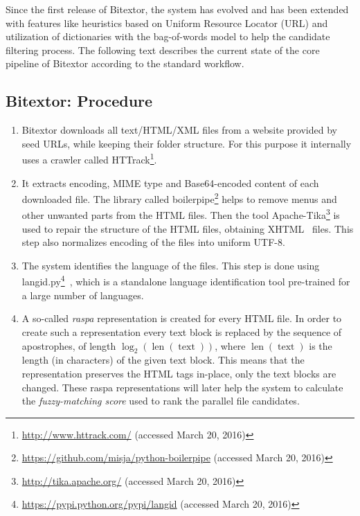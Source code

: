 Since the first release of Bitextor, the system has evolved and has been extended with features like heuristics based on Uniform Resource Locator (URL) and utilization of dictionaries with the bag-of-words model to help the candidate filtering process. The following text describes the current state of the core pipeline of Bitextor according to the standard workflow.

\subsection{Bitextor: Procedure}
\label{subsection:bitextor_procedure}

\begin{enumerate}
	\item Bitextor downloads all text/HTML/XML files from a website provided by seed URLs, while keeping their folder structure. For this purpose it internally uses a crawler called HTTrack\footnote{\url{http://www.httrack.com/} (accessed March 20, 2016)}.
	
	\item It extracts encoding, MIME type and Base64-encoded content of each downloaded file. The library called boilerpipe\footnote{\url{https://github.com/misja/python-boilerpipe} (accessed March 20, 2016)} helps to remove menus and other unwanted parts from the HTML files. Then the tool Apache-Tika\footnote{\url{http://tika.apache.org/} (accessed March 20, 2016)} is used to repair the structure of the HTML files, obtaining XHTML~\cite{XHTML} files. This step also normalizes encoding of the files into uniform UTF-8.
	
	\item The system identifies the language of the files. This step is done using langid.py\footnote{\url{https://pypi.python.org/pypi/langid} (accessed March 20, 2016)}~\cite{Lui12}, which is a standalone language identification tool pre-trained for a large number of languages.

	\item A so-called \textit{raspa} representation is created for every HTML file. In order to create such a representation every text block is replaced by the sequence of apostrophes, of length $\log_2(\operatorname{len}(\operatorname{text}))$, where $\operatorname{len}(\operatorname{text})$ is the length (in characters) of the given text block. This means that the representation preserves the HTML tags in-place, only the text blocks are changed. These raspa representations will later help the system to calculate the \textit{fuzzy-matching score} used to rank the parallel file candidates.
	

\end{enumerate}
